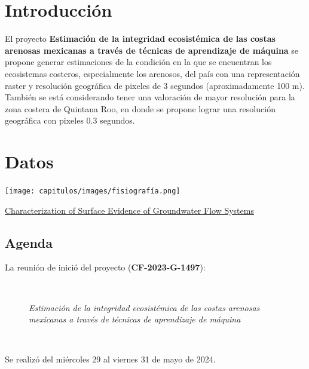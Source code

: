 \documentclass[
  letterpaper,
  DIV=11,
  numbers=noendperiod]{scrreprt}
\begin{document}

\chapter{Introducción}\label{introducciuxf3n}

El proyecto \textbf{Estimación de la integridad ecosistémica de las
costas arenosas mexicanas a través de técnicas de aprendizaje de
máquina} se propone generar estimaciones de la condición en la que se
encuentran los ecosistemas costeros, especialmente los arenosos, del
país con una representación raster y resolución geográfica de pixeles de
3 segundos (aproximadamente 100 m). También se está considerando tener
una valoración de mayor resolución para la zona costera de Quintana Roo,
en donde se propone lograr una resolución geográfica con pixeles 0.3
segundos.


\chapter{Datos}\label{datos}

\texttt{[image: capitulos/images/fisiografía.png]}

\href{https://www.mdpi.com/2073-4441/12/9/2459}{Characterization of
Surface Evidence of Groundwater Flow Systems}

\section{Agenda}\label{agenda}

La reunión de inició del proyecto (\textbf{CF-2023-G-1497}):

\begin{figure}

\begin{minipage}{0.08\linewidth}
~\end{minipage}%
%
\begin{minipage}{0.83\linewidth}
\emph{Estimación de la integridad ecosistémica de las costas arenosas
mexicanas a través de técnicas de aprendizaje de máquina}\end{minipage}%
%
\begin{minipage}{0.08\linewidth}
~\end{minipage}%

\end{figure}%

Se realizó del miércoles 29 al viernes 31 de mayo de 2024.
\end{document}
